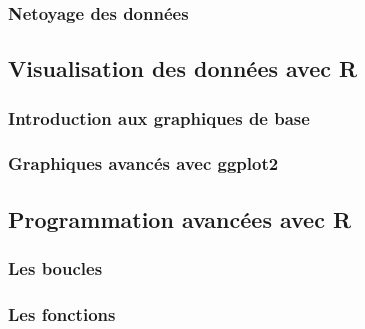 \documentclass[
]{article}
\begin{document}
\hypertarget{netoyage-des-donnuxe9es}{%
\subsubsection{Netoyage des données}\label{netoyage-des-donnuxe9es}}

\hypertarget{visualisation-des-donnuxe9es-avec-r}{%
\subsection{Visualisation des données avec
R}\label{visualisation-des-donnuxe9es-avec-r}}

\hypertarget{introduction-aux-graphiques-de-base}{%
\subsubsection{Introduction aux graphiques de
base}\label{introduction-aux-graphiques-de-base}}

\hypertarget{graphiques-avancuxe9s-avec-ggplot2}{%
\subsubsection{Graphiques avancés avec
ggplot2}\label{graphiques-avancuxe9s-avec-ggplot2}}

\hypertarget{programmation-avancuxe9es-avec-r}{%
\subsection{Programmation avancées avec
R}\label{programmation-avancuxe9es-avec-r}}

\hypertarget{les-boucles}{%
\subsubsection{Les boucles}\label{les-boucles}}

\hypertarget{les-fonctions}{%
\subsubsection{Les fonctions}\label{les-fonctions}}
\end{document}
